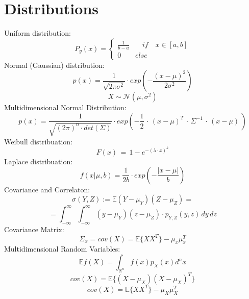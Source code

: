 \section*{Distributions}
Uniform distribution:
\begin{equation*}
{ P_{ y }(x) } = \left\{ \begin{matrix} \frac { 1 }{ b-a }  &  \quad if\quad x  \in  [a,b] \\ 0 & else \end{matrix} \right.
\end{equation*}
Normal (Gaussian) distribution:
\begin{equation*}
p(x) = \frac{1}{\sqrt{2\pi \sigma^2}}\cdot exp(-\frac{(x-\mu)^2}{2\sigma^2})
\end{equation*}
\begin{equation*}
X \sim \mathcal{N}(\mu, \sigma^2)
\end{equation*}
Multidimensional Normal Distribution:
\begin{equation*}
p(x)=\frac { 1 }{ \sqrt { (2\pi )^{ n }\cdot det(\Sigma ) }  } \cdot exp(-\frac { 1 }{ 2 } \, \cdot \, { (x-\mu ) }^{ T }\, \cdot \, \Sigma ^{ -1 }\, \cdot \, (x-\mu )\, )
\end{equation*}
Weibull distribuation: 
\begin{equation*}
F(x) \, = \, 1 - e^{-(\lambda \cdot x)^k}
\end{equation*}
Laplace distribuation:
\begin{equation*}
f(x|\mu,b) = \frac{1}{2b} \cdot exp (-\frac{|x-\mu|}{b})
\end{equation*}
Covariance and Correlaton:
\begin{equation*}
\sigma (Y,Z) := \mathbb{E} {(Y-\mu_Y)(Z-\mu_Z)} = 
\end{equation*}
\begin{equation*}
= \int_{-\infty}^{\infty}{\int_{-\infty}^{\infty}{(y-\mu_Y)(z - \mu_Z)\cdot p_{Y,Z} (y,z)\,  dy \, dz} }
\end{equation*}
Covariance Matrix:
\begin{equation*}
\Sigma_x = cov(X) = \mathbb{E}\{XX^T\} - \mu_x \mu^T_x
\end{equation*}
Multidimensional Random Variables:
\begin{equation*}
\mathbb{E}{f(X)} = \int_{\mathbb{R}^n}{f(x)p_X(x) d^n x}
\end{equation*}
\begin{equation*}
cov(X) = \mathbb{E} \{(X-\mu_X)(X-\mu_X)^T\} 
\end{equation*}
\begin{equation*}
cov(X) = \mathbb{E} \{XX^T\} - \mu_X \mu_X^T
\end{equation*}
